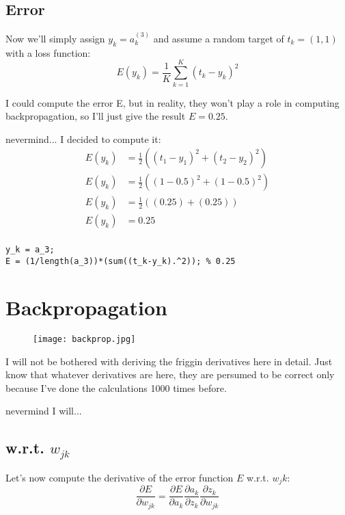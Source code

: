 \documentclass{article}
\begin{document}
\subsection{Error}
Now we'll simply assign $y_k = a_k^{(3)}$ and assume a random target of $t_k = (1,1)$ with a loss function:
\begin{equation*}
    E(y_k) = \frac{1}{K}\sum_{k=1}^K (t_k - y_k)^2
\end{equation*}

I could compute the error E, but in reality, they won't play a role in computing backpropagation, so I'll just give the result $E = 0.25$.

nevermind...  I decided to compute it:
\begin{align*}
    E(y_k) &= \frac{1}{2}((t_1 - y_1)^2 +(t_2 - y_2)^2)\\
    E(y_k) &= \frac{1}{2}((1 - 0.5)^2 +(1 - 0.5)^2)\\
    E(y_k) &= \frac{1}{2}((0.25) +(0.25))\\
    E(y_k) &= 0.25\\
\end{align*}

\begin{lstlisting}[style=matlab, label=your-label]
y_k = a_3;
E = (1/length(a_3))*(sum((t_k-y_k).^2)); % 0.25
\end{lstlisting}

\newpage
\section{Backpropagation}
\begin{figure}[h]
    \centering
    \texttt{[image: backprop.jpg]}
\end{figure}

I will not be bothered with deriving the friggin derivatives here in detail. Just know that whatever derivatives are here, they are persumed to be correct only because I've done the calculations 1000 times before.

nevermind I will...

\subsection{w.r.t. $w_{jk}$}
Let's now compute the derivative of the error function $E$ w.r.t. $w_jk$:
\begin{equation*}
    \frac{\partial E}{\partial w_{jk}} = \frac{\partial E}{\partial a_k} \frac{\partial a_k}{\partial z_k} \frac{\partial z_k}{\partial w_{jk}}
\end{equation*}
\end{document}

